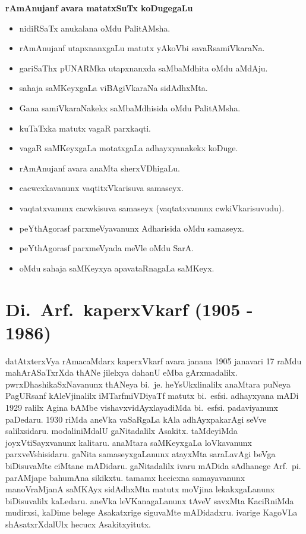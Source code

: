 \textbf{rAmAnujanf avara matatxSuTx koDugegaLu}
\begin{itemize}
\item nidiRSaTx anukalana oMdu PalitAMsha.
\item rAmAnujanf utapxnanxgaLu matutx yAkoVbi savaRsamiVkaraNa.
\item gariSaThx pUNARMka utapxnanxda saMbaMdhita oMdu aMdAju.
\item sahaja saMKeyxgaLa viBAgiVkaraNa sidAdhxMta.
\item Gana samiVkaraNakekx saMbaMdhisida oMdu PalitAMsha.
\item kuTaTxka matutx vagaR parxkaqti.
\item vagaR saMKeyxgaLa motatxgaLa adhayxyanakekx koDuge.
\item rAmAnujanf avara anaMta sherxVDhigaLu.
\item cacwcxkavanunx vaqtitxVkarisuva samaseyx.
\item vaqtatxvanunx cacwkisuva samaseyx (vaqtatxvanunx cwkiVkarisuvudu).
\item peYthAgorasf parxmeVyavanunx Adharisida oMdu samaseyx.
\item peYthAgorasf parxmeVyada meVle oMdu SarA.
\item oMdu sahaja saMKeyxya apavataRnagaLa saMKeyx.
\end{itemize}

\section{{\protect\bf Di.~Arf.\ kaperxVkarf  {\rm (1905 - 1986)}}}

\vskip -0.2cm

datAtxterxVya rAmacaMdarx kaperxVkarf avara janana {\rm 1905} janavari {\rm 17} raMdu mahArASaTxrXda thANe jilelxya dahanU eMba gArxmadalilx. pwrxDhashikaSxNavanunx thANeya bi.~je. heYsUkxli\break nalilx anaMtara puNeya PagURsanf kAleVjinalilx iMTarfmiVDiyaTf matutx bi.~esfsi. adhayxyana mADi {\rm 1929} ralilx Agina bAMbe vishavxvidAyxlayadiMda bi.~esfsi. padavi\break yanunx paDedaru. {\rm 1930} riMda aneVka vaSaRgaLa kAla adhAyxpakarAgi seVve salilxsidaru. modaliniMdalU gaNitadalilx Asakitx. taMdeyiMda joyxVtiSayxvanunx kalitaru. anaMtara saMKeyxgaLa loVkavanunx parxveVshisidaru. gaNita samaseyxgaLanunx atayxMta saraLavAgi beVga biDisuvaMte ciMtane mADidaru. gaNitadalilx ivaru mADida sAdhanege Arf.~pi. parAMjape bahumAna sikikxtu. tamamx hecicxna samayavanunx manoVraMjanA saMKAyx sidAdhxMta matutx moVjina lekakxgaLanunx biDisuvalilx kaLedaru. aneVka leVKanagaLanunx tAveV savxMta KaciRniMda mudirxsi, kaDime belege Asakatxrige siguvaMte mADidadxru. ivarige KagoVLa shAsatxrXdalUlx hecucx Asakitxyitutx. 

